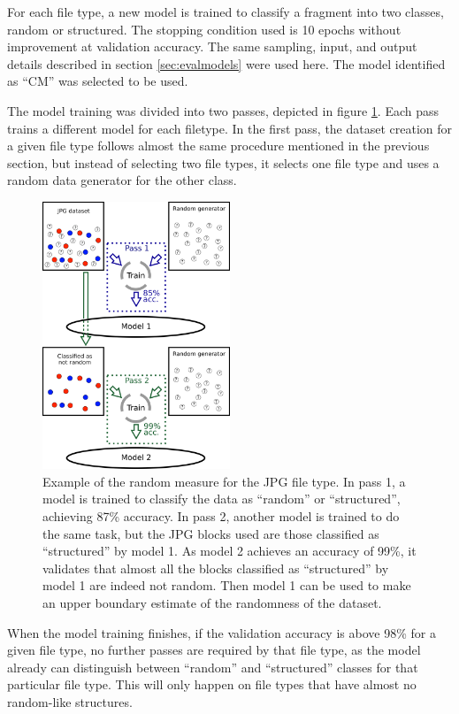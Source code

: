 For each file type, a new model is trained to classify a fragment into two classes, random or structured. The stopping condition used is 10 epochs without improvement at validation accuracy.
The same sampling, input, and output details described in section \ref{sec:evalmodels} were used here. The model identified as ``CM'' was selected to be used.


The model training was divided into two passes, depicted in figure \ref{fig:randommeasure}. Each pass trains a different model for each filetype. In the first pass, the dataset creation for a given file type follows almost the same procedure mentioned in the previous section, but instead of selecting two file types, it selects one file type and uses a random data generator for the other class.

\noindent
\begin{figure}[htb!]
\centering\includegraphics[width=0.5\textwidth]{content/random_measure.png}
\caption{\label{fig:randommeasure}Example of the random measure for the JPG file type. In pass 1, a model is trained to classify the data as ``random'' or ``structured'', achieving 87\% accuracy. In pass 2, another model is trained to do the same task, but the JPG blocks used are those classified as ``structured'' by model 1. As model 2 achieves an accuracy of 99\%, it validates that almost all the blocks classified as ``structured'' by model 1 are indeed not random. Then model 1 can be used to make an upper boundary estimate of the randomness of the dataset.}%
\end{figure}

When the model training finishes, if the validation accuracy is above 98\% for a given file type, no further passes are required by that file type, as the model already can distinguish between ``random'' and ``structured'' classes for that particular file type. This will only happen on file types that have almost no random-like structures.

